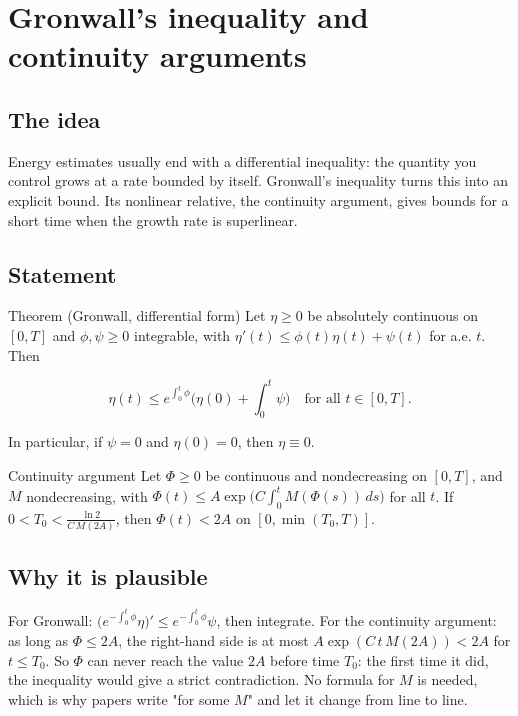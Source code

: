 
\section{Gronwall's inequality and continuity arguments}\label{p:gronwall}

\subsection*{The idea}

Energy estimates usually end with a differential inequality: the quantity you control grows at a rate bounded by itself. Gronwall's inequality turns this into an explicit bound. Its nonlinear relative, the continuity argument, gives bounds for a short time when the growth rate is superlinear.

\subsection*{Statement}

\begin{thmbox}{Theorem (Gronwall, differential form)}
Let $\eta\ge0$ be absolutely continuous on $[0,T]$ and $\phi,\psi\ge0$ integrable, with $\eta'(t)\le\phi(t)\eta(t)+\psi(t)$ for a.e. $t$. Then

\[ \eta(t)\le e^{\int_0^t\phi}\Big(\eta(0)+\int_0^t\psi\Big)\quad\text{for all } t\in[0,T]. \]

In particular, if $\psi = 0$ and $\eta(0)=0$, then $\eta\equiv0$.
\end{thmbox}

\begin{thmbox}{Continuity argument}
Let $\Phi\ge0$ be continuous and nondecreasing on $[0,T]$, and $M$ nondecreasing, with $\Phi(t)\le A\exp\big(C\int_0^t M(\Phi(s))\,ds\big)$ for all $t$. If $0< T_0< \frac{\ln 2}{C\,M(2A)}$, then $\Phi(t)< 2A$ on $[0,\min(T_0,T)]$.
\end{thmbox}

\subsection*{Why it is plausible}

For Gronwall: $\big(e^{-\int_0^t\phi}\eta\big)'\le e^{-\int_0^t\phi}\psi$, then integrate. For the continuity argument: as long as $\Phi\le 2A$, the right-hand side is at most $A\exp(C\,t\,M(2A))< 2A$ for $t\le T_0$. So $\Phi$ can never reach the value $2A$ before time $T_0$: the first time it did, the inequality would give a strict contradiction. No formula for $M$ is needed, which is why papers write "for some $M$" and let it change from line to line.


